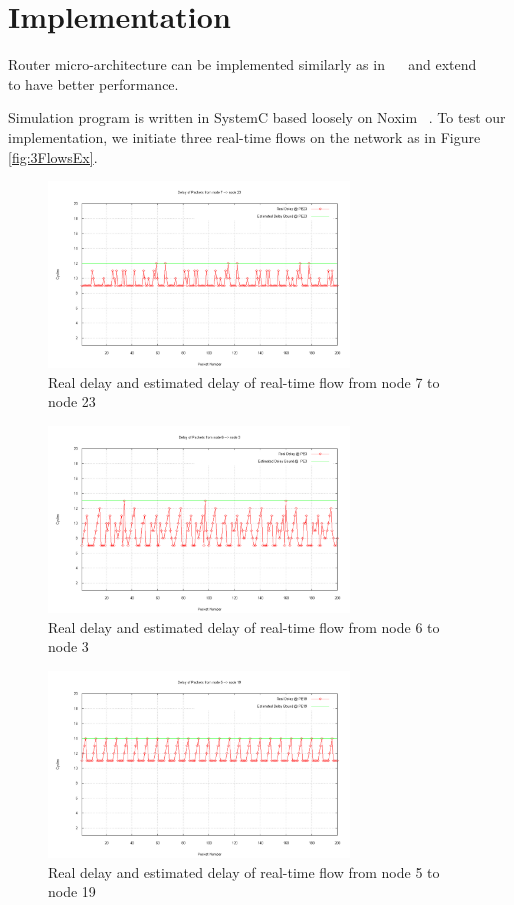 \documentclass[conference, twocolumn]{IEEEtran}
\theoremstyle{definition}
\begin{document}
\section{Implementation}
Router micro-architecture can be implemented similarly as in
~\cite{Rexford98arouter}~\cite{ZhangService} and extend
~\cite{PehDelayModel}~\cite{PehSpecPipeR} to have better performance.

Simulation program is written in SystemC based loosely on Noxim ~\cite{Noxim}.
To test our implementation, we initiate three real-time flows on the network as
in Figure \ref{fig:3FlowsEx}.

\begin{figure}[htp]
\centering
\includegraphics[width=8cm]{pics/PE23.png}
\caption[Flow from node 7 to node 23.]
{Real delay and estimated delay of real-time flow from node
7 to node 23}\label{fig:PE7PE23}
\end{figure}

\begin{figure}[htp]
\centering
\includegraphics[width=8cm]{pics/PE3.png}
\caption[Three flows example.]
{Real delay and estimated delay of real-time flow from node
6 to node 3}\label{fig:PE6PE3}
\end{figure}

\begin{figure}[htp]
\centering
\includegraphics[width=8cm]{pics/PE19.png}
\caption[Three flows example.]
{Real delay and estimated delay of real-time flow from node
5 to node 19}\label{fig:PE5PE19}
\end{figure}
\end{document}

